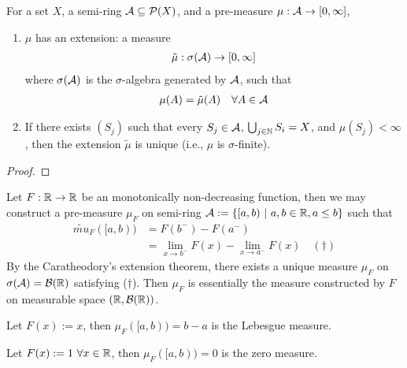 \documentclass[11pt]{article}
\numberwithin{equation}{section}
\newcommand{\s}[0]{$\sigma$}
\begin{document}
	\begin{theorem}
	    For a set $X$, a semi-ring $\mathcal{{A}} \subseteq \mathcal{{P}}(X)$, and a pre-measure $\mu: \mathcal{{A}} \to [0, \infty]$,
	    \begin{enumerate}
	        \item $\mu$ has an extension: a measure \begin{align}
	            \tilde{\mu}: \sigma(\mathcal{{A}}) \to [0, \infty]
	        \end{align}
	        where $\sigma(\mathcal{{A}})$ is the \s-algebra generated by $\mathcal{{A}}$, such that
	        \begin{align}
	            \mu(A) = \tilde{\mu}(A)\quad \forall A \in \mathcal{{A}}
	        \end{align}
	        \item If there exists $(S_j)$ such that every $S_j \in \mathcal{{A}}$, $\bigcup_{j \in \mathbb{N}} S_i = X$, and $\mu(S_j) < \infty$, then the extension $\tilde{\mu}$ is unique (i.e., $\mu$ is \s-finite).
	    \end{enumerate}
	\end{theorem}
	
	\begin{proof}
	\end{proof}
	
	\begin{definition}
	    Let $F: \mathbb{R} \to \mathbb{R}$ be an monotonically non-decreasing function, then we may construct a pre-measure $\mu_F$ on semi-ring $\mathcal{{A}} := \{[a,b)\ |\ a, b \in \mathbb{R}, a \leq b\}$ such that
	    \begin{align}
	        \tilde{mu}_F([a, b)) &= F(b^-) - F(a^-) \\&= \lim_{x \to b^-} F(x) - \lim_{x \to a^-} F(x)\quad (\dagger)
	    \end{align}
	    By the Caratheodory's extension theorem, there exists a unique measure $\mu_F$ on $\sigma(\mathcal{{A}}) = \mathcal{{B}}(\mathbb{R})$ satisfying ($\dagger$).
	    Then $\mu_F$ is essentially the measure constructed by $F$ on measurable space $(\mathbb{R}, \mathcal{{B}}(\mathbb{R}))$.
	\end{definition}
	
	\begin{example}
	    Let $F(x) := x$, then $\mu_F([a, b)) = b - a$ is the Lebesgue measure.
	\end{example}
	
	\begin{example}
	    Let $F(x) := 1\ \forall x \in \mathbb{R}$, then $\mu_F([a, b)) = 0$ is the zero measure.
	\end{example}
	
\end{document}
